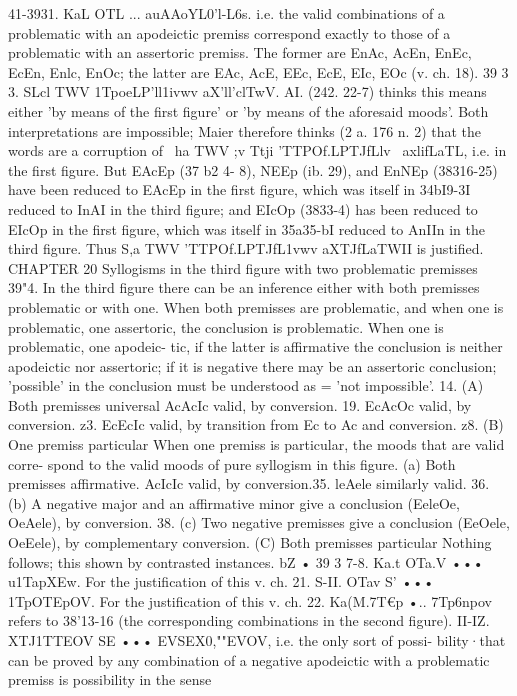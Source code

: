 {{{{{{{{{41-3931. KaL OTL ... auAAoYL0'l-L6s. i.e. the valid combinations
of a problematic with an apodeictic premiss correspond exactly
to those of a problematic with an assertoric premiss. The former
are EnAc, AcEn, EnEc, EcEn, Enlc, EnOc; the latter are EAc, AcE,
EEc, EcE, EIc, EOc (v. ch. 18).
39 3 3. SLcl TWV 1TpoeLP'll1ivwv aX'll'clTwV. AI. (242. 22-7) thinks
this means either 'by means of the first figure' or 'by means of the
aforesaid moods'. Both interpretations are impossible; Maier
therefore thinks (2 a. 176 n. 2) that the words are a corruption of
~ha TWV ;v Ttji 'TTPOf.LPTJfLlv~ axlifLaTL, i.e. in the first figure. But
EAcEp (37 b2 4- 8), NEEp (ib. 29), and EnNEp (38316-25) have
been reduced to EAcEp in the first figure, which was itself in
34bI9-3I reduced to InAI in the third figure; and EIcOp (3833-4)
has been reduced to EIcOp in the first figure, which was itself
in 35a35-bI reduced to AnIIn in the third figure. Thus S,a TWV
'TTPOf.LPTJfL1vwv aXTJfLaTWII is justified.
CHAPTER 20
Syllogisms in the third figure with two problematic premisses
39"4. In the third figure there can be an inference either with
both premisses problematic or with one. When both premisses
are problematic, and when one is problematic, one assertoric, the
conclusion is problematic. When one is problematic, one apodeic-
tic, if the latter is affirmative the conclusion is neither apodeictic
nor assertoric; if it is negative there may be an assertoric
conclusion; 'possible' in the conclusion must be understood as
= 'not impossible'.
14.
(A) Both premisses universal
AcAcIc valid, by conversion.
19. EcAcOc valid, by conversion.
z3. EcEcIc valid, by transition from Ec to Ac and conversion.
z8.
(B) One premiss particular
When one premiss is particular, the moods that are valid corre-
spond to the valid moods of pure syllogism in this figure. (a)
Both premisses affirmative. AcIcIc valid, by conversion.35. leAele similarly valid.
36. (b) A negative major and an affirmative minor give a
conclusion (EeleOe, OeAele), by conversion.
38. (c) Two negative premisses give a conclusion (EeOele,
OeEele), by complementary conversion.
(C) Both premisses particular
Nothing follows; this shown by contrasted instances.
bZ •
39 3 7-8. Ka.t OTa.V ••• u1TapXEw. For the justification of this
v. ch. 21.
S-II. OTav S' ••• 1TpOTEpOV. For the justification of this v.
ch. 22. Ka(M.7T€p •.. 7Tp6npov refers to 38'13-16 (the corresponding
combinations in the second figure).
II-IZ. XTJ1TTEOV SE ••• EVSEX0,""EVOV, i.e. the only sort of possi-
bility·that can be proved by any combination of a negative
apodeictic with a problematic premiss is possibility in the sense
}}}}}}}}}
